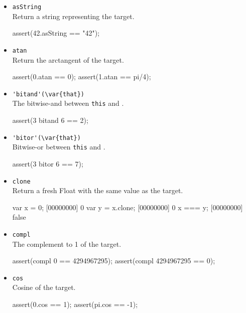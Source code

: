 \begin{itemize}
\item \lstinline|asString|\\
  Return a string representing the target.
\begin{urbiscript}[firstnumber=last]
assert(42.asString == "42");
\end{urbiscript}

\item \lstinline|atan|\\
  Return the arctangent of the target.
\begin{urbiscript}[firstnumber=last]
assert(0.atan == 0);
assert(1.atan == pi/4);
\end{urbiscript}

\item \lstinline|'bitand'(\var{that})|\\
  The bitwise-and between \lstinline|this| and .
\begin{urbiscript}[firstnumber=last]
assert(3 bitand 6 == 2);
\end{urbiscript}

\item \lstinline|'bitor'(\var{that})|\\
  Bitwise-or between \lstinline|this| and .
\begin{urbiscript}[firstnumber=last]
assert(3 bitor 6 == 7);
\end{urbiscript}

\item \lstinline|clone|\\
  Return a fresh Float with the same value as the target.
\begin{urbiscript}[firstnumber=last]
var x = 0;
[00000000] 0
var y = x.clone;
[00000000] 0
x === y;
[00000000] false
\end{urbiscript}

\item \lstinline|compl|\\
  The complement to 1 of the target.
\begin{urbiscript}[firstnumber=last]
assert(compl 0 == 4294967295);
assert(compl 4294967295 == 0);
\end{urbiscript}

\item \lstinline|cos|\\
  Cosine of the target.
\begin{urbiscript}[firstnumber=last]
assert(0.cos == 1);
assert(pi.cos == -1);
\end{urbiscript}


\end{itemize}
